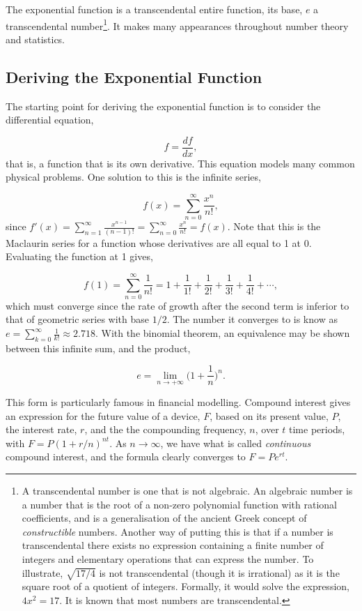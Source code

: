 \documentclass[11pt]{amsart}
\begin{document}
The exponential function is a transcendental entire function, its base, $e$ a transcendental number\footnote{A transcendental number is one that is not algebraic. An algebraic number is a number that is the root of a non-zero polynomial function with rational coefficients, and is a generalisation of the ancient Greek concept of \emph{constructible} numbers. Another way of putting this is that if a number is transcendental there exists no expression containing a finite number of integers and elementary operations that can express the number. To illustrate, $\sqrt{17/4}$ is not transcendental (though it is irrational) as it is the square root of a quotient of integers. Formally, it would solve the expression, $4x^2 = 17$. It is known that most numbers are transcendental.}. It makes many appearances throughout number theory and statistics.

\subsection{Deriving the Exponential Function}

The starting point for deriving the exponential function is to consider the differential equation,

$$f = \frac{df}{dx},$$ that is, a function that is its own derivative. This equation models many common physical problems. One solution to this is the infinite series,

$$f(x) = \sum_{n=0}^{\infty} \frac{x^n}{n!},$$ since $f'(x) = \sum_{n=1}^{\infty} \frac{x^{n-1}}{(n - 1)!} = \sum_{n=0}^{\infty} \frac{x^{n}}{n!} = f(x)$. Note that this is the Maclaurin series for a function whose derivatives are all equal to 1 at 0. Evaluating the function at 1 gives,

$$f(1) = \sum_{n=0}^{\infty} \frac{1}{n!} = 1 + \frac{1}{1!} + \frac{1}{2!} + \frac{1}{3!} + \frac{1}{4!} + \cdots,$$ which must converge since the rate of growth after the second term is inferior to that of geometric series with base $1/2$. The number it converges to is know as $e = \sum_{k=0}^{\infty}  \frac{1}{k!} \approx 2.718.$ With the binomial theorem, an equivalence may be shown between this infinite sum, and the product,

$$e = \lim_{n \to +\infty} \bigg(1 + \frac{1}{n}\bigg)^n.$$

This form is particularly famous in financial modelling. Compound interest gives an expression for the future value of a device, $F$, based on its present value, $P$, the interest rate, $r$, and the the compounding frequency, $n$, over $t$ time periods, with $F = P(1 + r/n)^{nt}$. As $n\to\infty$, we have what is called \emph{continuous} compound interest, and the formula clearly converges to $F = Pe^{rt}$.
\end{document}
